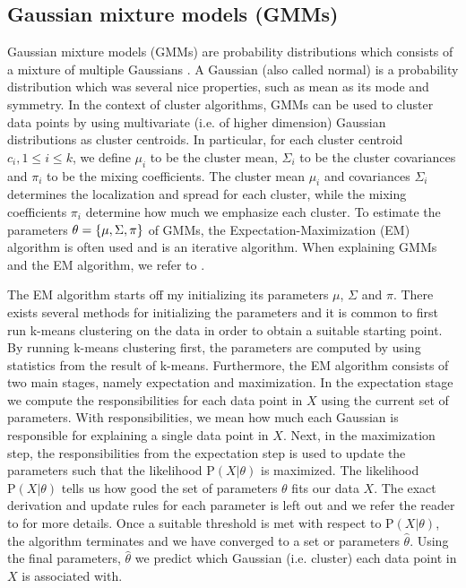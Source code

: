 \subsection{Gaussian mixture models (GMMs)}
\label{sec:gmm-clustering}
Gaussian mixture models (GMMs) are probability distributions which consists of a mixture of multiple Gaussians \cite[Section 9.2]{bishop2006}. A Gaussian (also called normal) is a probability distribution which was several nice properties, such as mean as its mode and symmetry. In the context of cluster algorithms, GMMs can be used to cluster data points by using multivariate (i.e. of higher dimension) Gaussian distributions as cluster centroids. In particular, for each cluster centroid $c_i, 1 \leq i \leq k$, we define $\mu_i$ to be the cluster mean, $\Sigma_i$ to be the cluster covariances and $\pi_i$ to be the mixing coefficients. The cluster mean $\mu_i$ and covariances $\Sigma_i$ determines the localization and spread for each cluster, while the mixing coefficients $\pi_i$ determine how much we emphasize each cluster. To estimate the parameters $\theta = \left\{\mu, \Sigma, \pi\right\}$ of GMMs, the Expectation-Maximization (EM) algorithm is often used and is an iterative algorithm. When explaining GMMs and the EM algorithm, we refer to \cite[Section 9.2]{bishop2006}.

The EM algorithm starts off my initializing its parameters $\mu$, $\Sigma$ and $\pi$. There exists several methods for initializing the parameters and it is common to first run k-means clustering on the data in order to obtain a suitable starting point. By running k-means clustering first, the parameters are computed by using statistics from the result of k-means. Furthermore, the EM algorithm consists of two main stages, namely expectation and maximization. In the expectation stage we compute the responsibilities for each data point in $X$ using the current set of parameters. With responsibilities, we mean how much each Gaussian is responsible for explaining a single data point in $X$. Next, in the maximization step, the responsibilities from the expectation step is used to update the parameters such that the likelihood $\text{P}(X | \theta)$ is maximized. The likelihood $\text{P}(X | \theta)$ tells us how good the set of parameters $\theta$ fits our data $X$. The exact derivation and update rules for each parameter is left out and we refer the reader to \cite[Section 9.4]{bishop2006} for more details. Once a suitable threshold is met with respect to $\text{P}(X | \theta)$, the algorithm terminates and we have converged to a set or parameters $\hat{\theta}$. Using the final parameters, $\hat{\theta}$ we predict which Gaussian (i.e. cluster) each data point in $X$ is associated with.

